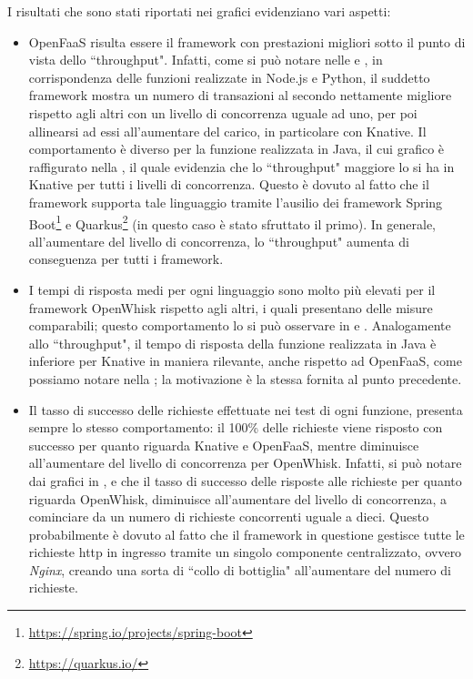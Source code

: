 \documentclass[12pt,a4paper,openany,twoside]{book}
\begin{document}
I risultati che sono stati riportati nei grafici evidenziano vari aspetti:
\begin{itemize}
    \item OpenFaaS risulta essere il framework con prestazioni migliori sotto il punto di vista dello ``throughput". Infatti, come si può notare nelle   e , in corrispondenza delle funzioni realizzate in Node.js e Python, il suddetto framework mostra un numero di transazioni al secondo nettamente migliore rispetto agli altri con un livello di concorrenza uguale ad uno, per poi allinearsi ad essi all'aumentare del carico, in particolare con Knative. Il comportamento è diverso per la funzione realizzata in Java, il cui grafico è raffigurato nella , il quale evidenzia che lo ``throughput" maggiore lo si ha in Knative per tutti i livelli di concorrenza. Questo è dovuto al fatto che il framework supporta tale linguaggio tramite l'ausilio dei framework Spring Boot\footnote{\url{https://spring.io/projects/spring-boot}} e Quarkus\footnote{\url{https://quarkus.io/}} (in questo caso è stato sfruttato il primo). In generale, all'aumentare del livello di concorrenza, lo ``throughput" aumenta di conseguenza per tutti i framework.
    
    \item I tempi di risposta medi per ogni linguaggio sono molto più elevati per il framework OpenWhisk rispetto agli altri, i quali presentano delle misure comparabili; questo comportamento lo si può osservare in  e . Analogamente allo ``throughput", il tempo di risposta della funzione realizzata in Java è inferiore per Knative in maniera rilevante, anche rispetto ad OpenFaaS, come possiamo notare nella ; la motivazione è la stessa fornita al punto precedente.
    
    \item Il tasso di successo delle richieste effettuate nei test di ogni funzione, presenta sempre lo stesso comportamento: il 100\% delle richieste viene risposto con successo per quanto riguarda Knative e OpenFaaS, mentre diminuisce all'aumentare del livello di concorrenza per OpenWhisk. Infatti, si può notare dai grafici in ,  e  che il tasso di successo delle risposte alle richieste per quanto riguarda OpenWhisk, diminuisce all'aumentare del livello di concorrenza, a cominciare da un numero di richieste concorrenti uguale a dieci. Questo probabilmente è dovuto al fatto che il framework in questione gestisce tutte le richieste \ac{http} in ingresso tramite un singolo componente centralizzato, ovvero \textit{Nginx}, creando una sorta di ``collo di bottiglia" all'aumentare del numero di richieste.
\end{itemize}
\end{document}
